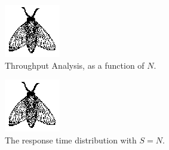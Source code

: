 \begin{figure}
	\label{fig:evaluation-throughput}
	\includegraphics{fig/fly}
	\caption{Throughput Analysis, as a function of $N$.}
\end{figure}

\begin{figure}
	\label{fig:evaluation-response-time-distribution}
	\includegraphics{fig/fly}
	\caption{The response time distribution with $S=N$.}
\end{figure}
